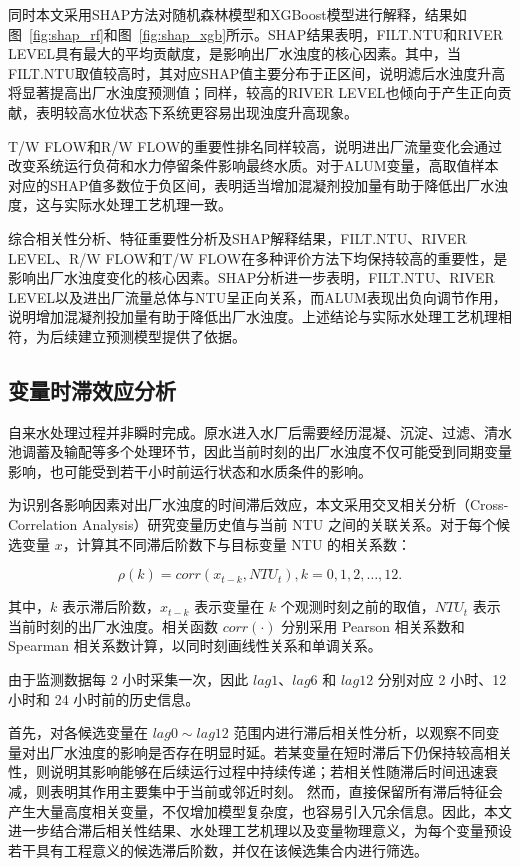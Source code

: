 \documentclass[UTF8,zihao=-4]{ctexart}
\begin{document}
同时本文采用SHAP方法对随机森林模型和XGBoost模型进行解释，结果如图~\ref{fig:shap_rf}和图~\ref{fig:shap_xgb}所示。SHAP结果表明，FILT.NTU和RIVER LEVEL具有最大的平均贡献度，是影响出厂水浊度的核心因素。其中，当FILT.NTU取值较高时，其对应SHAP值主要分布于正区间，说明滤后水浊度升高将显著提高出厂水浊度预测值；同样，较高的RIVER LEVEL也倾向于产生正向贡献，表明较高水位状态下系统更容易出现浊度升高现象。

T/W FLOW和R/W FLOW的重要性排名同样较高，说明进出厂流量变化会通过改变系统运行负荷和水力停留条件影响最终水质。对于ALUM变量，高取值样本对应的SHAP值多数位于负区间，表明适当增加混凝剂投加量有助于降低出厂水浊度，这与实际水处理工艺机理一致。

综合相关性分析、特征重要性分析及SHAP解释结果，FILT.NTU、RIVER LEVEL、R/W FLOW和T/W FLOW在多种评价方法下均保持较高的重要性，是影响出厂水浊度变化的核心因素。SHAP分析进一步表明，FILT.NTU、RIVER LEVEL以及进出厂流量总体与NTU呈正向关系，而ALUM表现出负向调节作用，说明增加混凝剂投加量有助于降低出厂水浊度。上述结论与实际水处理工艺机理相符，为后续建立预测模型提供了依据。

\subsection{变量时滞效应分析}

自来水处理过程并非瞬时完成。原水进入水厂后需要经历混凝、沉淀、过滤、清水池调蓄及输配等多个处理环节，因此当前时刻的出厂水浊度不仅可能受到同期变量影响，也可能受到若干小时前运行状态和水质条件的影响。

为识别各影响因素对出厂水浊度的时间滞后效应，本文采用交叉相关分析（Cross-Correlation Analysis）研究变量历史值与当前 NTU 之间的关联关系。对于每个候选变量 $x$，计算其不同滞后阶数下与目标变量 NTU 的相关系数：

\[
\rho(k)=corr(x_{t-k},NTU_t), k=0,1,2,\ldots,12.
\]

其中，$k$ 表示滞后阶数，$x_{t-k}$ 表示变量在 $k$ 个观测时刻之前的取值，$NTU_t$ 表示当前时刻的出厂水浊度。相关函数 $corr(\cdot)$ 分别采用 Pearson 相关系数和 Spearman 相关系数计算，以同时刻画线性关系和单调关系。

由于监测数据每 2 小时采集一次，因此 $lag1$、$lag6$ 和 $lag12$ 分别对应 2 小时、12 小时和 24 小时前的历史信息。

首先，对各候选变量在 $lag0\sim lag12$ 范围内进行滞后相关性分析，以观察不同变量对出厂水浊度的影响是否存在明显时延。若某变量在短时滞后下仍保持较高相关性，则说明其影响能够在后续运行过程中持续传递；若相关性随滞后时间迅速衰减，则表明其作用主要集中于当前或邻近时刻。
然而，直接保留所有滞后特征会产生大量高度相关变量，不仅增加模型复杂度，也容易引入冗余信息。因此，本文进一步结合滞后相关性结果、水处理工艺机理以及变量物理意义，为每个变量预设若干具有工程意义的候选滞后阶数，并仅在该候选集合内进行筛选。
\end{document}
